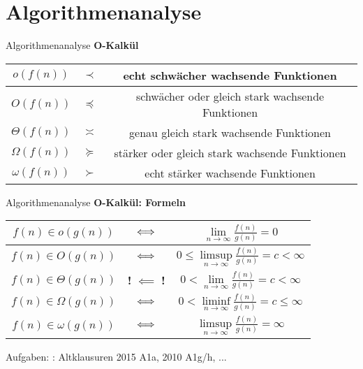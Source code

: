 \section{Algorithmenanalyse}

\begin{frame}{Algorithmenanalyse}
	\textbf{O-Kalkül} \\
	{
		\renewcommand{\arraystretch}{2}%
	
		\begin{center}
			\begin{tabular}{ | c | >{\Large}c | c | }
				\hline
				$     o (f(n))$ & $\prec$ & echt schwächer wachsende Funktionen
				\\ \hline
				$     O (f(n))$ & $\preccurlyeq$ & schwächer oder gleich stark wachsende Funktionen
				\\ \hline
				$\Theta (f(n))$ & $\asymp$ & genau gleich stark wachsende Funktionen
				\\ \hline
				$\Omega (f(n))$ & $\succcurlyeq$ & stärker oder gleich stark wachsende Funktionen
				\\ \hline
				$\omega (f(n))$ & $\succ$ & echt stärker wachsende Funktionen
				\\ \hline
			\end{tabular}
		\end{center}
	}
\end{frame}

\begin{frame}{Algorithmenanalyse}
	\textbf{O-Kalkül: Formeln} \\
	{
		\renewcommand{\arraystretch}{2}%
		\begin{center}
			\begin{tabular}{ | c | c | >{\quad}c<{\quad} | }
				\hline
				$f(n) \in o      (g(n))$ & $\Gdw$ & \(\lim\limits_{n \to \infty} \frac{f(n)}{g(n)} = 0\) 
				\\  \hline
				$f(n) \in O      (g(n))$ & $\Gdw$ & \(0 \leq \limsup\limits_{n \to \infty} \frac{f(n)}{g(n)} = c < \infty\)
				\\ \hline
				$f(n) \in \Theta (g(n))$ & \cellcolor{adaptingred} {\textbf{!} $\bm{\impliedby}$ \textbf{!}} & \(0 < \lim\limits_{n \to \infty} \frac{f(n)}{g(n)} = c < \infty\)
				\\ \hline
				$f(n) \in \Omega (g(n))$ & $\Gdw$ & \(0 < \liminf\limits_{n \to \infty} \frac{f(n)}{g(n)} = c \leq \infty\)
				\\ \hline
				$f(n) \in \omega (g(n))$ & $\Gdw$ & \(\limsup\limits_{n \to \infty} \frac{f(n)}{g(n)} = \infty\)
				\\ \hline
			\end{tabular}
		\end{center}
	}
	\bigskip
	\small
	Aufgaben: \ZB: Altklausuren 2015 A1a, 2010 A1g/h, ...
\end{frame}

